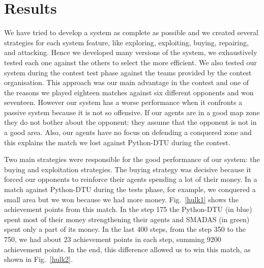 





\section{Results}
We have tried to develop a system as complete as possible and we created several strategies for each system feature, like exploring, exploiting, buying, repairing, and attacking. Hence we developed many versions of the system, we exhaustively tested each one against the others to select the more efficient. We also tested our system during the contest test phase against the teams provided by the contest organisation. This approach was our main advantage in the contest and one of the reasons we played eighteen matches against six different opponents and won seventeen. However our system has a worse performance when it confronts a passive system because it is not so offensive. If our agents are in a good map zone they do not bother about the opponent: they assume that the opponent is not in a good area. Also, our agents have no focus on defending a conquered zone and this explains the match we lost against Python-DTU during the contest.

Two main strategies were responsible for the good performance of our system: the buying and exploitation strategies. The buying strategy was decisive because it forced our opponents to reinforce their agents spending a lot of their money. In a match against Python-DTU during the tests phase, for example, we conquered a small area but we won because we had more money. Fig.~\ref{hulk1} shows the achievement points from this match. In the step 175 the Python-DTU (in blue) spent most of their money strengthening their agents and SMADAS (in green) spent only a part of its money. In the last 400 steps, from the step 350 to the 750, we had about 23 achievement points in each step, summing 9200 achievement points. In the end, this difference allowed us to win this match, as shown in Fig.~\ref{hulk2}.

